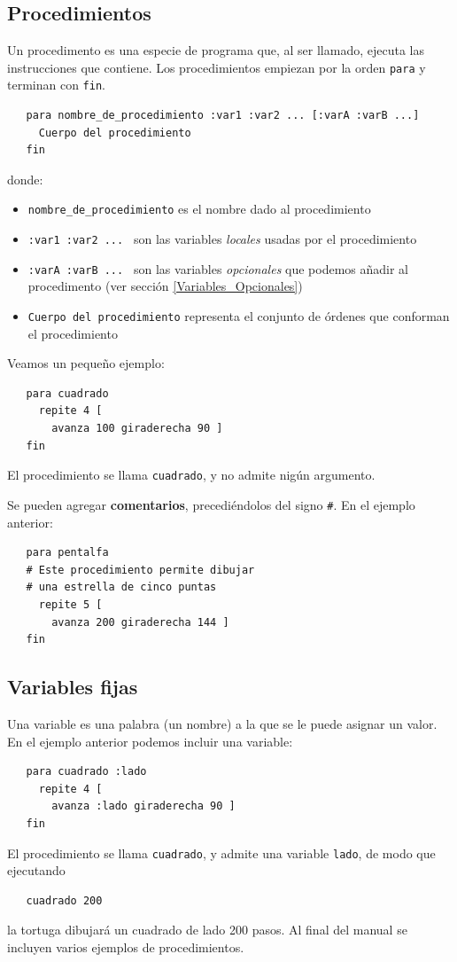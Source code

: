 \subsection{Procedimientos}

Un procedimento es una especie de programa que, al ser llamado, ejecuta las
instrucciones que contiene. Los procedimientos empiezan por la orden
\texttt{para}  y terminan con \texttt{fin}. 
\begin{verbatim}
   para nombre_de_procedimiento :var1 :var2 ... [:varA :varB ...]
     Cuerpo del procedimiento
   fin \end{verbatim}
donde:
\begin{itemize}
   \item \verb+nombre_de_procedimiento+ es el nombre dado al procedimiento
   \item \verb+:var1 :var2 ... + son las variables \textit{locales} usadas por
      el procedimiento
   \item \verb+:varA :varB ... + son las variables \textit{opcionales} que
      podemos a\~nadir al procedimento (ver secci\'on
      \ref{Variables_Opcionales})
   \item \verb+Cuerpo del procedimiento+ representa el conjunto de \'ordenes
      que conforman el procedimiento
\end{itemize}

Veamos un peque\~no ejemplo:
\begin{verbatim}
   para cuadrado
     repite 4 [
       avanza 100 giraderecha 90 ]
   fin \end{verbatim}
El procedimiento se llama \verb+cuadrado+, y no admite nig\'un argumento.

Se pueden agregar \textbf{comentarios}, precedi\'endolos
del signo \texttt{\#}.  En el ejemplo anterior:
\begin{verbatim}
   para pentalfa 
   # Este procedimiento permite dibujar
   # una estrella de cinco puntas
     repite 5 [
       avanza 200 giraderecha 144 ]
   fin \end{verbatim}

\subsection{Variables fijas}

Una variable es una palabra (un nombre) a la que se le puede
asignar un valor. En el ejemplo anterior podemos incluir una variable:
\begin{verbatim}
   para cuadrado :lado
     repite 4 [
       avanza :lado giraderecha 90 ]
   fin \end{verbatim}
El procedimiento se llama \verb+cuadrado+, y admite una variable \verb+lado+,
de modo que ejecutando
\begin{verbatim}
   cuadrado 200 \end{verbatim}
la tortuga dibujar\'a un cuadrado de lado 200 pasos. Al final del manual
se incluyen varios ejemplos de procedimientos.


